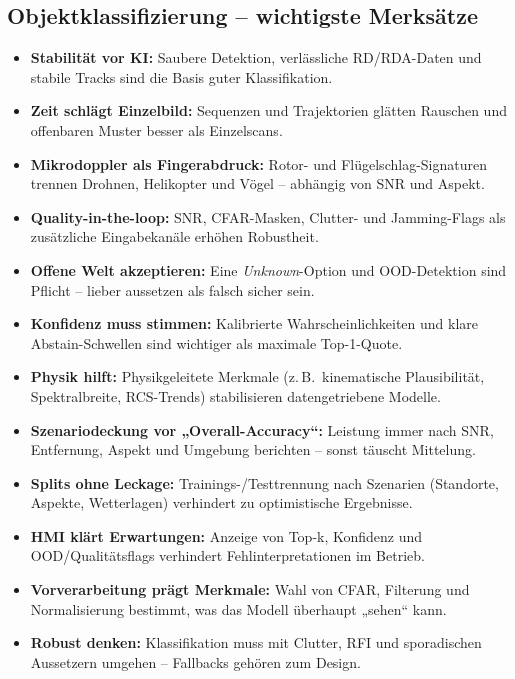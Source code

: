 \subsection{Objektklassifizierung – wichtigste Merksätze}
\begin{itemize}
  \item \textbf{Stabilität vor KI:} Saubere Detektion, verlässliche RD/RDA-Daten und stabile Tracks sind die Basis guter Klassifikation.
  \item \textbf{Zeit schlägt Einzelbild:} Sequenzen und Trajektorien glätten Rauschen und offenbaren Muster besser als Einzelscans.
  \item \textbf{Mikrodoppler als Fingerabdruck:} Rotor- und Flügelschlag-Signaturen trennen Drohnen, Helikopter und Vögel – abhängig von SNR und Aspekt.
  \item \textbf{Quality-in-the-loop:} SNR, CFAR-Masken, Clutter- und Jamming-Flags als zusätzliche Eingabekanäle erhöhen Robustheit.                          %
  \item \textbf{Offene Welt akzeptieren:} Eine \emph{Unknown}-Option und OOD-Detektion sind Pflicht – lieber aussetzen als falsch sicher sein.
  \item \textbf{Konfidenz muss stimmen:} Kalibrierte Wahrscheinlichkeiten und klare Abstain-Schwellen sind wichtiger als maximale Top-1-Quote.
  \item \textbf{Physik hilft:} Physikgeleitete Merkmale (z.\,B.\ kinematische Plausibilität, Spektralbreite, RCS-Trends) stabilisieren datengetriebene Modelle. %
  \item \textbf{Szenariodeckung vor „Overall-Accuracy“:} Leistung immer nach SNR, Entfernung, Aspekt und Umgebung berichten – sonst täuscht Mittelung.
  \item \textbf{Splits ohne Leckage:} Trainings-/Testtrennung nach Szenarien (Standorte, Aspekte, Wetterlagen) verhindert zu optimistische Ergebnisse.
  \item \textbf{HMI klärt Erwartungen:} Anzeige von Top-k, Konfidenz und OOD/Qualitätsflags verhindert Fehlinterpretationen im Betrieb.                         %
  \item \textbf{Vorverarbeitung prägt Merkmale:} Wahl von CFAR, Filterung und Normalisierung bestimmt, was das Modell überhaupt „sehen“ kann.
  \item \textbf{Robust denken:} Klassifikation muss mit Clutter, RFI und sporadischen Aussetzern umgehen – Fallbacks gehören zum Design.                        %
\end{itemize}








